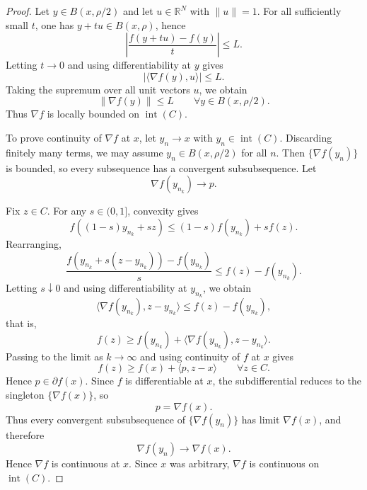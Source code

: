 \documentclass[reqno]{amsart}
\theoremstyle{definition}
\newcommand{\R}{\mathbb{R}}
\newcommand{\inner}[2]{\langle #1,#2\rangle}
\begin{document}
\begin{proof}
Let $y \in B(x,\rho/2)$ and let $u \in \R^N$ with $\|u\|=1$. For all
sufficiently small $t$, one has $y+tu \in B(x,\rho)$, hence
\begin{equation}
    \left|\frac{f(y+tu)-f(y)}{t}\right| \leq L.
\end{equation}
Letting $t \to 0$ and using differentiability at $y$ gives
\begin{equation}
    |\inner{\nabla f(y)}{u}| \leq L.
\end{equation}
Taking the supremum over all unit vectors $u$, we obtain
\begin{equation}
    \|\nabla f(y)\| \leq L
    \qquad \forall y \in B(x,\rho/2).
\end{equation}
Thus $\nabla f$ is locally bounded on $\operatorname{int}(C)$.

To prove continuity of $\nabla f$ at $x$, let $y_n \to x$ with
$y_n \in \operatorname{int}(C)$. Discarding finitely many terms, we may assume
$y_n \in B(x,\rho/2)$ for all $n$. Then $\{\nabla f(y_n)\}$ is bounded, so every
subsequence has a convergent subsubsequence. Let
\begin{equation}
    \nabla f(y_{n_k}) \to p.
\end{equation}

Fix $z \in C$. For any $s \in (0,1]$, convexity gives
\begin{equation}
    f((1-s)y_{n_k}+sz) \leq (1-s)f(y_{n_k})+sf(z).
\end{equation}
Rearranging,
\begin{equation}
    \frac{f(y_{n_k}+s(z-y_{n_k}))-f(y_{n_k})}{s}
    \leq f(z)-f(y_{n_k}).
\end{equation}
Letting $s \downarrow 0$ and using differentiability at $y_{n_k}$, we obtain
\begin{equation}
    \inner{\nabla f(y_{n_k})}{z-y_{n_k}} \leq f(z)-f(y_{n_k}),
\end{equation}
that is,
\begin{equation}
    f(z) \geq f(y_{n_k})+\inner{\nabla f(y_{n_k})}{z-y_{n_k}}.
\end{equation}
Passing to the limit as $k \to \infty$ and using continuity of $f$ at $x$ gives
\begin{equation}
    f(z) \geq f(x)+\inner{p}{z-x}
    \qquad \forall z \in C.
\end{equation}
Hence $p \in \partial f(x)$. Since $f$ is differentiable at $x$, the
subdifferential reduces to the singleton $\{\nabla f(x)\}$, so
\begin{equation}
    p=\nabla f(x).
\end{equation}
Thus every convergent subsubsequence of $\{\nabla f(y_n)\}$ has limit
$\nabla f(x)$, and therefore
\begin{equation}
    \nabla f(y_n) \to \nabla f(x).
\end{equation}
Hence $\nabla f$ is continuous at $x$. Since $x$ was arbitrary, $\nabla f$ is
continuous on $\operatorname{int}(C)$.
\end{proof}
\end{document}
